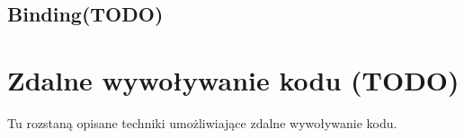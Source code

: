 \subsection{Binding(TODO)}
%
%
%
%
%
%
%
%

\section{Zdalne wywoływanie kodu (TODO)}
Tu rozstaną opisane techniki umożliwiające zdalne wywoływanie kodu.

